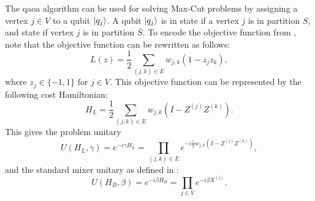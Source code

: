 The \gls{qaoa} algorithm can be used for solving Max-Cut problems by assigning a vertex $j \in V$ to a qubit $\vert{q_j}\rangle$.
A qubit $\vert{q_j}\rangle$ is in state  if a vertex $j$ is in partition $S$, and state  if vertex $j$ is in partition $\bar{S}$.
To encode the objective function from , note that the objective function can be rewritten as follows:
\begin{equation}
L(z) = \frac{1}{2} \sum_{(j, k) \in E} w_{j, k}(1 - z_jz_k),
\end{equation}
where $z_j \in \{-1, 1\}$ for $j \in V$.
This objective function can be represented by the following cost Hamiltonian:
\begin{equation} \label{eqn:problem-hamiltonian}
H_L = \frac{1}{2} \sum_{(j, k) \in E} w_{j, k}(I - Z^{(j)}Z^{(k)}).
\end{equation}
This gives the problem unitary
\begin{equation} \label{eqn:problem-unitary}
U(H_L, \gamma) = e^{-i\gamma H_L} = \prod_{(j, k) \in E} e^{-i\tfrac{\gamma}{2}w_{j, k}(I - Z^{(j)}Z^{(k)})},
\end{equation}
and the standard mixer unitary as defined in :
\begin{equation} \label{eqn:mixer-unitary}
U(H_B, \beta) = e^{-i\beta H_B} = \prod_{j \in V} e^{-i\beta X^{(j)}}.
\end{equation}

